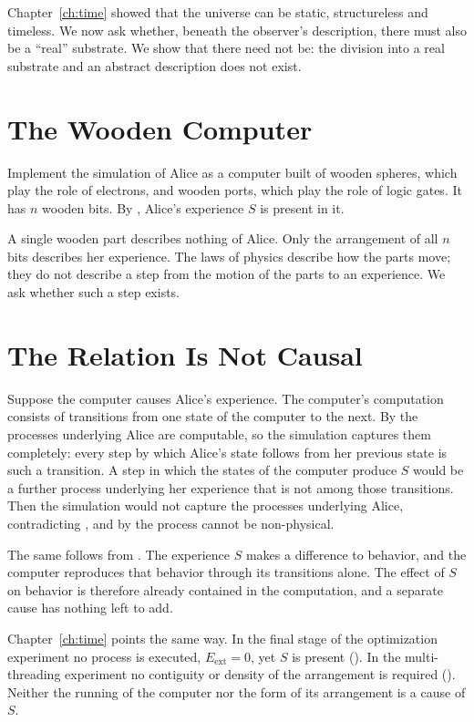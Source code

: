 \documentclass[11pt]{book}
\begin{document}
Chapter~\ref{ch:time} showed that the universe can be static,
structureless and timeless. We now ask whether, beneath the observer's
description, there must also be a ``real'' substrate. We show that there
need not be: the division into a real substrate and an abstract
description does not exist.


\section{The Wooden Computer}
\label{sec:wooden}

Implement the simulation of Alice as a computer built of wooden spheres,
which play the role of electrons, and wooden ports, which play the role
of logic gates. It has $n$ wooden bits. By , Alice's
experience $S$ is present in it.

A single wooden part describes nothing of Alice. Only the arrangement of
all $n$ bits describes her experience. The laws of physics describe how
the parts move; they do not describe a step from the motion of the parts
to an experience. We ask whether such a step exists.


\section{The Relation Is Not Causal}
\label{sec:not-causal}

Suppose the computer causes Alice's experience. The computer's
computation consists of transitions from one state of the computer to the
next. By  the processes underlying Alice are
computable, so the simulation captures them completely: every step by
which Alice's state follows from her previous state is such a transition.
A step in which the states of the computer produce $S$ would be a further
process underlying her experience that is not among those transitions.
Then the simulation would not capture the processes underlying Alice,
contradicting , and by  the process
cannot be non-physical.

The same follows from . The experience $S$ makes a
difference to behavior, and the computer reproduces that behavior through
its transitions alone. The effect of $S$ on behavior is therefore already
contained in the computation, and a separate cause has nothing left to
add.

Chapter~\ref{ch:time} points the same way. In the final stage of the
optimization experiment no process is executed, $E_{\mathrm{ext}} = 0$,
yet $S$ is present (). In the multi-threading experiment
no contiguity or density of the arrangement is required
(). Neither the running of the computer nor the
form of its arrangement is a cause of $S$.
\end{document}
